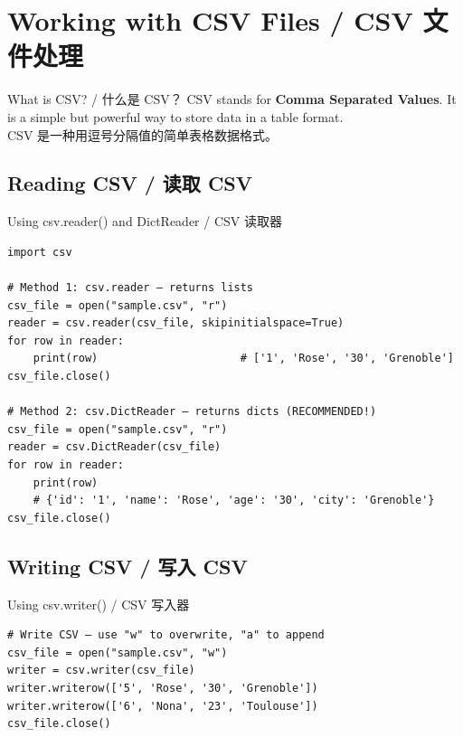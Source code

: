 \documentclass[11pt,a4paper]{article}
\begin{document}
\section{Working with CSV Files / CSV 文件处理}

\begin{concept}{What is CSV? / 什么是 CSV？}
    CSV stands for \textbf{Comma Separated Values}. It is a simple but powerful way to store data in a table format. \\
    CSV 是一种用逗号分隔值的简单表格数据格式。
\end{concept}

\subsection{Reading CSV / 读取 CSV}

\begin{examplebox}{Using csv.reader() and DictReader / CSV 读取器}
\begin{lstlisting}
import csv

# Method 1: csv.reader — returns lists
csv_file = open("sample.csv", "r")
reader = csv.reader(csv_file, skipinitialspace=True)
for row in reader:
    print(row)                      # ['1', 'Rose', '30', 'Grenoble']
csv_file.close()

# Method 2: csv.DictReader — returns dicts (RECOMMENDED!)
csv_file = open("sample.csv", "r")
reader = csv.DictReader(csv_file)
for row in reader:
    print(row)
    # {'id': '1', 'name': 'Rose', 'age': '30', 'city': 'Grenoble'}
csv_file.close()
\end{lstlisting}
\end{examplebox}

\subsection{Writing CSV / 写入 CSV}

\begin{examplebox}{Using csv.writer() / CSV 写入器}
\begin{lstlisting}
# Write CSV — use "w" to overwrite, "a" to append
csv_file = open("sample.csv", "w")
writer = csv.writer(csv_file)
writer.writerow(['5', 'Rose', '30', 'Grenoble'])
writer.writerow(['6', 'Nona', '23', 'Toulouse'])
csv_file.close()
\end{lstlisting}
\end{examplebox}
\end{document}
